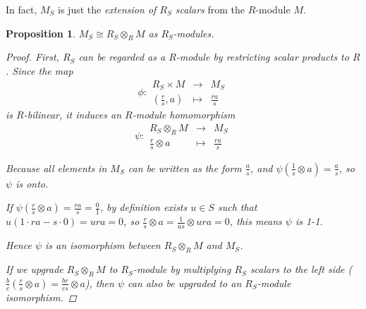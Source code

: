 \documentclass[a4paper]{article}
\theoremstyle{mystyle}
\newtheorem{prop}{Proposition}
\begin{document}
In fact, $M_S$ is just the {\it extension of $R_S$ scalars}
from the $R$-module $M$.
\begin{prop}
  $M_S \cong R_S \otimes_R M$ as $R_S$-modules.
  \begin{proof}
    First, $R_S$ can be regarded as a $R$-module by restricting scalar products to $R$.
    Since the map
    \[
      \phi : \begin{array}{ccc}
        R_S \times M &\longrightarrow& M_S \\
        (\frac{r}{s}, a) &\longmapsto& \frac{ra}{s}
      \end{array}
    \]
    is $R$-bilinear, it induces an $R$-module homomorphism
    \[
      \psi : \begin{array}{ccc}
        R_S \otimes_R M &\longrightarrow& M_S \\
        \frac{r}{s} \otimes a &\longmapsto& \frac{ra}{s}
      \end{array}
    \]

    Because all elements in $M_S$ can be written as the form $\frac{a}{s}$, and 
    $\psi(\frac{1}{s} \otimes a) = \frac{a}{s}$, so $\psi$ is onto.

    If $\psi(\frac{r}{s} \otimes a) = \frac{ra}{s} = \frac{0}{1}$, 
    by definition exists $u \in S$ such that
    $u(1 \cdot ra - s \cdot 0) = ura = 0$, 
    so $\frac{r}{s} \otimes a = \frac{1}{us} \otimes ura = 0$, this means
    $\psi$ is 1-1.

    Hence $\psi$ is an isomorphism between $R_S \otimes_R M$ and $M_S$.

    If we upgrade $R_S \otimes_R M$ to $R_S$-module by multiplying $R_S$ scalars
    to the left side ($\frac{b}{c}(\frac{r}{s} \otimes a) = \frac{br}{cs} \otimes a$),
    then $\psi$ can also be upgraded to an $R_S$-module isomorphism. 
  \end{proof}
\end{prop}
\end{document}
